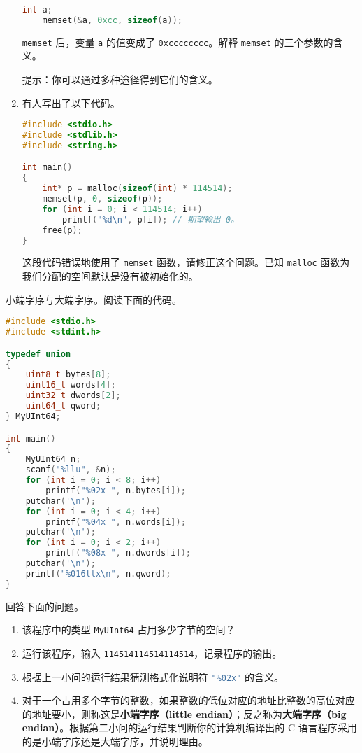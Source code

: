 \begin{problemset}
\begin{enumerate}
		\begin{lstlisting}[language=c, numbers=none, moreemph={[2]memset}]
	int a;
	memset(&a, 0xcc, sizeof(a));
		\end{lstlisting}

		\lstinline[language=c, moreemph={[2]memset}]{memset} 后，变量 \lstinline{a} 的值变成了 \lstinline{0xcccccccc}。解释 \lstinline[language=c, moreemph={[2]memset}]{memset} 的三个参数的含义。

		提示：你可以通过多种途径得到它们的含义。

		\item 有人写出了以下代码。

		\begin{lstlisting}[language=c, moreemph={[2]memset, malloc, free}]
#include <stdio.h>
#include <stdlib.h>
#include <string.h>

int main()
{
	int* p = malloc(sizeof(int) * 114514);
	memset(p, 0, sizeof(p));
	for (int i = 0; i < 114514; i++)
		printf("%d\n", p[i]); // 期望输出 0。
	free(p);
}
		\end{lstlisting}

		这段代码错误地使用了 \lstinline[language=c, moreemph={[2]memset}]{memset} 函数，请修正这个问题。已知 \lstinline[language=c, moreemph={[2]malloc}]{malloc} 函数为我们分配的空间默认是没有被初始化的。
	\end{enumerate}

	\item 小端字序与大端字序。阅读下面的代码。

	\begin{lstlisting}[language=c, moreemph={[1]uint8_t, uint16_t, uint32_t, uint64_t, MyUInt64}, moreemph={[2]putchar}]
#include <stdio.h>
#include <stdint.h>

typedef union
{
	uint8_t bytes[8];
	uint16_t words[4];
	uint32_t dwords[2];
	uint64_t qword;
} MyUInt64;

int main()
{
	MyUInt64 n;
	scanf("%llu", &n);
	for (int i = 0; i < 8; i++)
		printf("%02x ", n.bytes[i]);
	putchar('\n');
	for (int i = 0; i < 4; i++)
		printf("%04x ", n.words[i]);
	putchar('\n');
	for (int i = 0; i < 2; i++)
		printf("%08x ", n.dwords[i]);
	putchar('\n');
	printf("%016llx\n", n.qword);
}
	\end{lstlisting}

	回答下面的问题。

	\begin{enumerate}
		\item 该程序中的类型 \lstinline[language=c, moreemph={[1]MyUInt64}]{MyUInt64} 占用多少字节的空间？
		\item 运行该程序，输入 \lstinline{114514114514114514}，记录程序的输出。
		\item 根据上一小问的运行结果猜测格式化说明符 \lstinline[language=c]{"%02x"} 的含义。
		\item 对于一个占用多个字节的整数，如果整数的低位对应的地址比整数的高位对应的地址要小，则称这是\textbf{小端字序（little endian）}；反之称为\textbf{大端字序（big endian）}。根据第二小问的运行结果判断你的计算机编译出的 C 语言程序采用的是小端字序还是大端字序，并说明理由。
	\end{enumerate}


\end{problemset}
